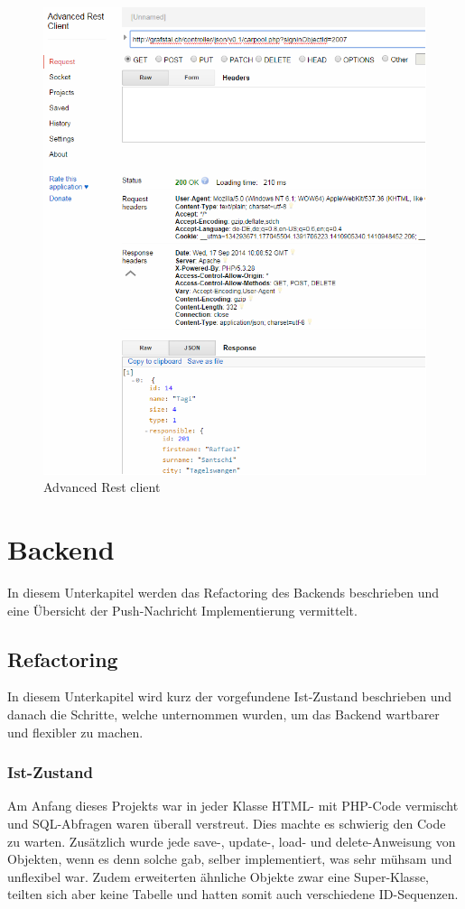 \begin{figure}[h]
\centering
\includegraphics[scale=0.5]{images/advanced_rest_client.png}
\caption{Advanced Rest client}
\label{fig:advanced_rest_client}
\end{figure}

\FloatBarrier


\clearpage
\section{Backend}\label{impl_backend}
In diesem Unterkapitel werden das Refactoring des Backends beschrieben und eine Übersicht der Push-Nachricht Implementierung vermittelt.

\subsection{Refactoring}
In diesem Unterkapitel wird kurz der vorgefundene Ist-Zustand beschrieben und danach die Schritte, welche unternommen wurden, um das Backend wartbarer und flexibler zu machen.

\subsubsection{Ist-Zustand}
Am Anfang dieses Projekts war in jeder Klasse HTML- mit PHP-Code vermischt und SQL-Abfragen waren überall verstreut. Dies machte es schwierig den Code zu warten. Zusätzlich wurde jede save-, update-, load- und delete-Anweisung von Objekten, wenn es denn solche gab, selber implementiert, was sehr mühsam und unflexibel war. Zudem erweiterten ähnliche Objekte zwar eine Super-Klasse, teilten sich aber keine Tabelle und hatten somit auch verschiedene ID-Sequenzen.\\

